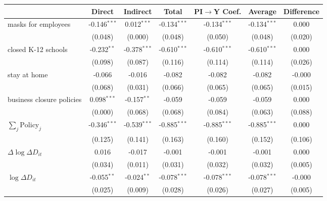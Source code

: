 
\begin{tabular}{lccccc|>{}c}
\toprule
  & Direct & Indirect & Total & PI$\to$Y Coef. & Average & Difference\\
\midrule
masks for employees & -0.146$^{***}$ & 0.012$^{***}$ & -0.134$^{***}$ & -0.134$^{***}$ & -0.134$^{***}$ & 0.000\\
 & (0.048) & (0.000) & (0.048) & (0.050) & (0.048) & (0.020)\\
closed K-12 schools & -0.232$^{**}$ & -0.378$^{***}$ & -0.610$^{***}$ & -0.610$^{***}$ & -0.610$^{***}$ & 0.000\\
 & (0.098) & (0.087) & (0.116) & (0.114) & (0.114) & (0.026)\\
stay at home & -0.066 & -0.016 & -0.082 & -0.082 & -0.082 & -0.000\\
 & (0.068) & (0.031) & (0.066) & (0.065) & (0.065) & (0.015)\\
business closure policies & 0.098$^{***}$ & -0.157$^{**}$ & -0.059 & -0.059 & -0.059 & 0.000\\
 & (0.000) & (0.068) & (0.068) & (0.084) & (0.063) & (0.088)\\
$\sum_j \mathrm{Policy}_j$ & -0.346$^{***}$ & -0.539$^{***}$ & -0.885$^{***}$ & -0.885$^{***}$ & -0.885$^{***}$ & 0.000\\
 & (0.125) & (0.141) & (0.163) & (0.160) & (0.152) & (0.106)\\
$\Delta \log \Delta D_{it}$ & 0.016 & -0.017 & -0.001 & -0.001 & -0.001 & 0.000\\
 & (0.034) & (0.011) & (0.031) & (0.032) & (0.032) & (0.005)\\
$\log \Delta D_{it}$ & -0.055$^{**}$ & -0.024$^{**}$ & -0.078$^{***}$ & -0.078$^{***}$ & -0.078$^{***}$ & -0.000\\
 & (0.025) & (0.009) & (0.028) & (0.026) & (0.027) & (0.005)\\
\bottomrule
\end{tabular}
